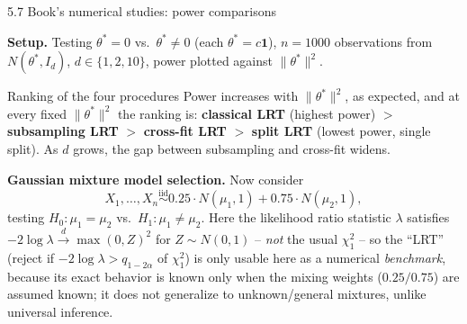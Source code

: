 \documentclass[aspectratio=169,10pt]{beamer}
\begin{document}
\begin{frame}{5.7 Book's numerical studies: power comparisons}

  \textbf{Setup.} Testing $\theta^*=0$ vs.\ $\theta^*\ne 0$ (each
  $\theta^* = c\mathbf{1}$), $n=1000$ observations from $N(\theta^*,I_d)$,
  $d\in\{1,2,10\}$, power plotted against $\|\theta^*\|^2$.

  \begin{block}{Ranking of the four procedures}
    Power increases with $\|\theta^*\|^2$, as expected, and at every
    fixed $\|\theta^*\|^2$ the ranking is: \textbf{classical LRT}
    (highest power) $>$ \textbf{subsampling LRT} $>$ \textbf{cross-fit
    LRT} $>$ \textbf{split LRT} (lowest power, single split). As $d$
    grows, the gap between subsampling and cross-fit widens.
  \end{block}

  \textbf{Gaussian mixture model selection.} Now consider
  $$ X_1,\ldots,X_n \stackrel{\text{iid}}{\sim} 0.25\cdot N(\mu_1,1) + 0.75\cdot N(\mu_2,1), $$
  testing $H_0:\mu_1=\mu_2$ vs.\ $H_1:\mu_1\ne\mu_2$. Here the
  likelihood ratio statistic $\lambda$ satisfies
  $-2\log\lambda \stackrel{d}{\to} \max(0,Z)^2$ for $Z\sim N(0,1)$ --
  \emph{not} the usual $\chi_1^2$ -- so the ``LRT'' (reject if
  $-2\log\lambda > q_{1-2\alpha}$ of $\chi_1^2$) is only usable here as
  a numerical \emph{benchmark}, because its exact behavior is known
  only when the mixing weights ($0.25/0.75$) are assumed known; it does
  not generalize to unknown/general mixtures, unlike universal
  inference.

\end{frame}
\end{document}
